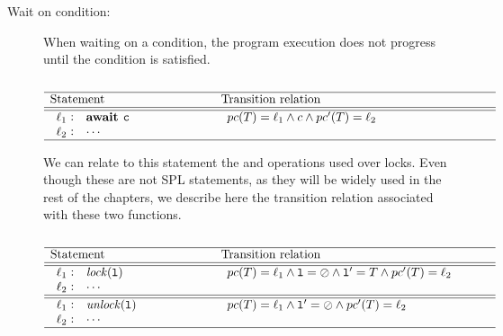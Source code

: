 \begin{description}
	\item [Wait on condition:]
		When waiting on a condition, the program execution does not progress 
		until the condition is satisfied.
	
		\[
			\begin{array}[t]{p{8em}@{\hspace{6em}}p{\longtablesize}}
				\hline
				Statement & Transition relation \\ \hline\hline
				$\begin{array}[t]{l@{\hspace{0.3em}}c@{\hspace{1em}}l}
					\ell_1 & : & \mathtt{\Await c} \\
					\ell_2 & : & \mathtt{\cdots}
				\end{array}$
				&
				$\begin{array}[t]{ll}
					\pc(T) = \ell_1 \andcond c \andcond \pc'(T) = \ell_2
				 \end{array}$ \\ \hline
			 \end{array}
		\]

	We can relate to this statement the \fLock and \fUnlock operations used 
	over locks.
%
	Even though these are not SPL statements, as they will be widely used in 
	the rest of the chapters, we describe here the transition relation 
	associated with these two functions.

		\[
			\begin{array}[t]{p{8em}@{\hspace{6em}}p{\longtablesize}}
				\hline
				Statement & Transition relation \\ \hline\hline
				$\begin{array}[t]{l@{\hspace{0.3em}}c@{\hspace{1em}}l}
					\ell_1 & : & \mathtt{\fLock(l)} \\
					\ell_2 & : & \mathtt{\cdots}
				\end{array}$
				&
				$\begin{array}[t]{ll}
					\pc(T) = \ell_1 \andcond
						\mathtt{l} = \oslash \andcond
						\mathtt{l}' = T \andcond \pc'(T) = \ell_2
				 \end{array}$ \\ \hline\hline
				$\begin{array}[t]{l@{\hspace{0.3em}}c@{\hspace{1em}}l}
					\ell_1 & : & \mathtt{\fUnlock(l)} \\
					\ell_2 & : & \mathtt{\cdots}
				\end{array}$
				&
				$\begin{array}[t]{ll}
					\pc(T) = \ell_1 \andcond
						\mathtt{l}' = \oslash \andcond \pc'(T) = \ell_2
				 \end{array}$ \\ \hline
			 \end{array}
		\]

\end{description}
